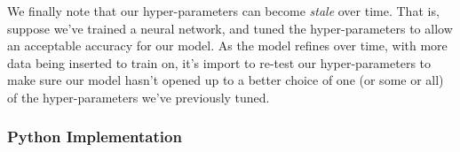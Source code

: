 We finally note that our hyper-parameters can become \textit{stale} over time.  That is, suppose we've trained a neural network, and tuned the hyper-parameters to allow an acceptable accuracy for our model.  As the model refines over time, with more data being inserted to train on, it's import to re-test our hyper-parameters to make sure our model hasn't opened up to a better choice of one (or some or all) of the hyper-parameters we've previously tuned.



\subsubsection{Python Implementation}

